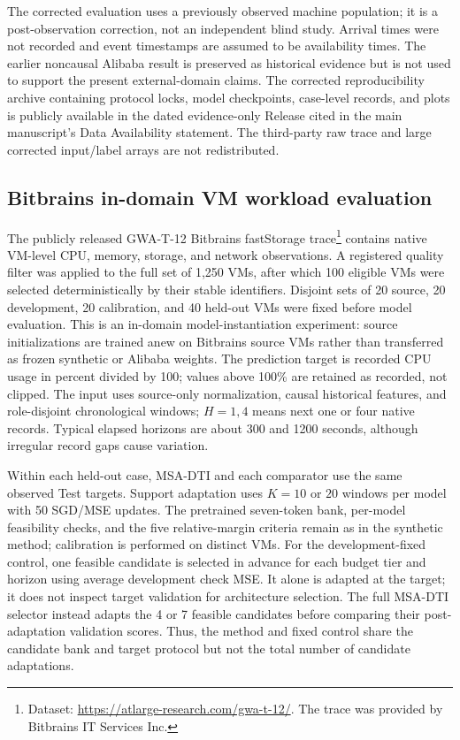 \documentclass[11pt,a4paper]{article}
\begin{document}
The corrected evaluation uses a previously observed machine population;
it is a post-observation correction, not an independent blind study. Arrival times were not recorded and event timestamps are assumed to
be availability times. The earlier noncausal Alibaba result is preserved as
historical evidence but is not used to support the present external-domain
claims. The corrected reproducibility archive containing protocol locks, model checkpoints, case-level records, and plots is publicly available in the dated evidence-only Release cited in the main manuscript's Data Availability statement. The third-party raw trace and large corrected input/label
arrays are not redistributed.


\subsection{Bitbrains in-domain VM workload evaluation}
\label{supp:bitbrains}

The publicly released GWA-T-12 Bitbrains fastStorage trace\footnote{Dataset: \url{https://atlarge-research.com/gwa-t-12/}.
The trace was provided by Bitbrains IT Services Inc.} contains native
VM-level CPU, memory, storage, and network observations. A registered quality
filter was applied to the full set of 1,250 VMs, after which 100 eligible VMs
were selected deterministically by their stable identifiers. Disjoint sets of
20 source, 20 development, 20 calibration, and 40 held-out VMs were fixed
before model evaluation. This is an in-domain model-instantiation experiment:
source initializations are trained anew on Bitbrains source VMs rather than
transferred as frozen synthetic or Alibaba weights. The prediction target is
recorded CPU usage in percent divided by 100; values above 100\% are retained
as recorded, not clipped. The input uses source-only normalization, causal
historical features, and role-disjoint chronological windows; $H=1,4$ means
next one or four native records. Typical elapsed horizons are about 300 and
1200 seconds, although irregular record gaps cause variation.

Within each held-out case, MSA-DTI and each comparator use the same observed
Test targets. Support adaptation uses $K=10$ or $20$ windows per model with
50 SGD/MSE updates. The pretrained seven-token bank, per-model feasibility
checks, and the five relative-margin criteria remain as in the synthetic
method; calibration is performed on distinct VMs. For the development-fixed
control, one feasible candidate is selected in advance for each budget tier
and horizon using average development check MSE. It alone is adapted at the
target; it does not inspect target validation for architecture selection.
The full MSA-DTI selector instead adapts the 4 or 7 feasible candidates
before comparing their post-adaptation validation scores. Thus, the method
and fixed control share the candidate bank and target protocol but not the
total number of candidate adaptations.
\end{document}
